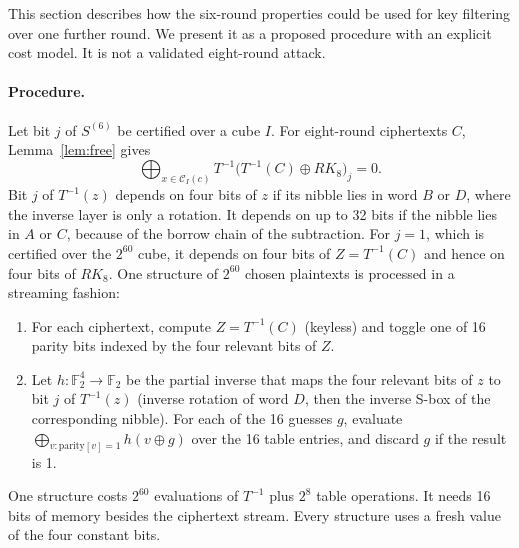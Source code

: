 \documentclass[pdflatex,sn-mathphys-num]{sn-jnl}
\theoremstyle{thmstyleone}
\theoremstyle{thmstylethree}
\theoremstyle{thmstyletwo}
\newcommand{\Ftwo}{\mathbb{F}_2}
\begin{document}
This section describes how the six-round properties could be used for key filtering over one further round. We present it as a proposed procedure with an explicit cost model. It is not a validated eight-round attack.

\paragraph{Procedure.} Let bit $j$ of $S^{(6)}$ be certified over a cube $I$. For eight-round ciphertexts $C$, Lemma~\ref{lem:free} gives
\[
\bigoplus_{x\in\mathcal C_I(c)} T^{-1}\!\big(T^{-1}(C)\oplus RK_8\big)_j = 0 .
\]
Bit $j$ of $T^{-1}(z)$ depends on four bits of $z$ if its nibble lies in word $B$ or $D$, where the inverse layer is only a rotation. It depends on up to 32 bits if the nibble lies in $A$ or $C$, because of the borrow chain of the subtraction. For $j=1$, which is certified over the $2^{60}$ cube, it depends on four bits of $Z=T^{-1}(C)$ and hence on four bits of $RK_8$. One structure of $2^{60}$ chosen plaintexts is processed in a streaming fashion:
\begin{enumerate}
\item For each ciphertext, compute $Z=T^{-1}(C)$ (keyless) and toggle one of 16 parity bits indexed by the four relevant bits of $Z$.
\item Let $h:\Ftwo^4\to\Ftwo$ be the partial inverse that maps the four relevant bits of $z$ to bit $j$ of $T^{-1}(z)$ (inverse rotation of word $D$, then the inverse S-box of the corresponding nibble). For each of the 16 guesses $g$, evaluate $\bigoplus_{v:\text{parity}[v]=1} h(v\oplus g)$ over the 16 table entries, and discard $g$ if the result is 1.
\end{enumerate}
One structure costs $2^{60}$ evaluations of $T^{-1}$ plus $2^8$ table operations. It needs 16 bits of memory besides the ciphertext stream. Every structure uses a fresh value of the four constant bits.
\end{document}
